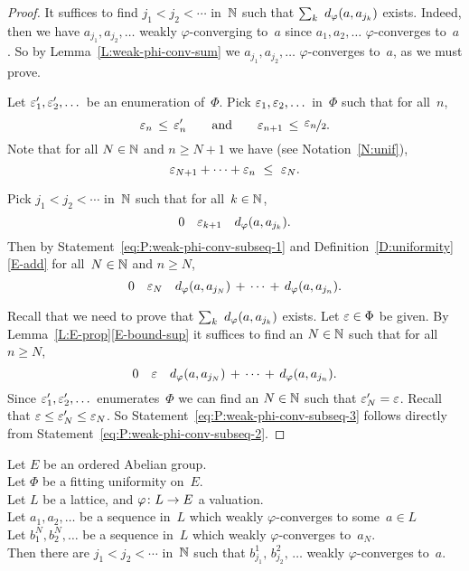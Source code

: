 \documentclass[main.tex]{subfiles}
\begin{document}
\begin{proof}
It suffices to find $j_1<j_2<\dotsb$ in~$\mathbb{N}$ such that
$\sum_k \ \ld\varphi(a,a_{j_k})$ exists.
Indeed,
then we have $a_{j_1},a_{j_2},\dotsc$
weakly $\varphi$-converging to~$a$
since $a_1,a_2,\dotsc$ $\varphi$-converges to~$a$.
So by Lemma~\ref{L:weak-phi-conv-sum} we 
$a_{j_1},a_{j_2},\dotsc$ $\varphi$-converges to~$a$, as we must prove.

Let $\varepsilon_1',\varepsilon_2',\dotsc$ be an enumeration of~$\Phi$.
Pick $\varepsilon_1,\varepsilon_2,\dotsc$ in~$\Phi$ such that for all~$n$,
\begin{equation*}
\varepsilon_{n} \,\leq\, \varepsilon_n ' \qquad\text{and}\qquad  \varepsilon_{n+1}\,\leq\,\smash{\nicefrac{\textstyle{\varepsilon_{n}}}{2}}.
\end{equation*}
Note that for all $N\in \mathbb{N}$ and $n\geq N+1$
we have
(see Notation~\ref{N:unif}),
\begin{equation}
\label{eq:P:weak-phi-conv-subseq-1}
\varepsilon_{N+1} + \dotsb + \varepsilon_{n} \ \leq\  \varepsilon_N.
\end{equation}

Pick $j_1 < j_2 < \dotsb$ in~$\mathbb{N}$ such that for all~$k\in\mathbb{N}$, 
\begin{equation*}
0\quad\varepsilon_{k+1}\quad d_{\smash{\varphi}}(a, a_{j_k}).
\end{equation*}
Then by Statement~\eqref{eq:P:weak-phi-conv-subseq-1} 
and Definition~\ref{D:uniformity}\ref{E-add} for all~$N\in\mathbb{N}$ and $n\geq N$,
\begin{equation}
\label{eq:P:weak-phi-conv-subseq-2}
0\quad\varepsilon_{N}\quad 
d_{\smash{\varphi}}(a, a_{j_N}) \,+\, \dotsb \,+\, d_{\smash{\varphi}}(a,a_{j_n}).
\end{equation}

Recall that we need to prove that $\sum_k\ \ld\varphi(a,a_{j_k})$ exists.
Let $\varepsilon \in \Phi$ be given.
By Lemma~\ref{L:E-prop}\ref{E-bound-sup}
it suffices to find an $N\in\mathbb{N}$ such that for all~$n\geq N$,
\begin{equation}
\label{eq:P:weak-phi-conv-subseq-3}
0\quad\varepsilon\quad d_{\smash{\varphi}}(a,a_{j_N}) \,+\, \dotsb \,+\, d_{\smash{\varphi}}(a,a_{j_n}).
\end{equation}
Since $\varepsilon_1',\varepsilon_2',\dotsc$ enumerates~$\Phi$
we can find an $N\in \mathbb{N}$ such that $\varepsilon_N'=\varepsilon$.
Recall that $\varepsilon \leq \varepsilon_N' \leq \varepsilon_N$.
So Statement~\eqref{eq:P:weak-phi-conv-subseq-3}
follows directly from Statement~\eqref{eq:P:weak-phi-conv-subseq-2}.
\end{proof}
%
%
\begin{lem}
\label{L:phi-conv-diag}
Let $E$ be an ordered Abelian group.\\
Let $\Phi$ be a fitting uniformity on~$E$.\\
Let $L$ be a lattice, and $\varphi\colon L \rightarrow E$ a valuation.\\
Let $a_1,a_2,\dotsc$ be a sequence in~$L$
which weakly $\varphi$-converges to some~$a\in L$\\
Let $b^N_1, b^N_2, \dotsc$
be a sequence in~$L$ which weakly $\varphi$-converges to~$a_N$.\\
Then there are $j_1 < j_2 < \dotsb$ in~$\mathbb{N}$ such that
 $b^1_{j_1},\,b^2_{j_2},\,\dotsc$
weakly $\varphi$-converges to~$a$.
\end{lem}
\end{document}
